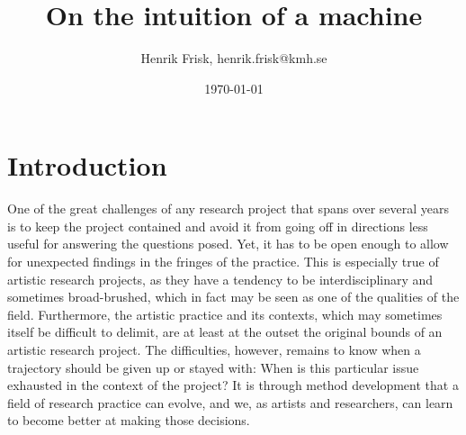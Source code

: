 \documentclass[11pt]{article}
\author{Henrik Frisk, henrik.frisk@kmh.se}
\date{\today}
\title{On the intuition of a machine}
\begin{document}
\maketitle

\section*{Introduction}
\label{sec:orga947df7}
One of the great challenges of any research project that spans over several years is to keep the project contained and avoid it from going off in directions less useful for answering the questions posed. Yet, it has to be open enough to allow for unexpected findings in the fringes of the practice. This is especially true of artistic research projects, as they have a tendency to be interdisciplinary and sometimes broad-brushed, which in fact may be seen as one of the qualities of the field. Furthermore, the artistic practice and its contexts, which may sometimes itself be difficult to delimit, are at least at the outset the original bounds of an artistic research project. The difficulties, however, remains to know when a trajectory should be given up or stayed with: When is this particular issue exhausted in the context of the project? It is through method development that a field of research practice can evolve, and we, as artists and researchers, can learn to become better at making those decisions.
\end{document}
